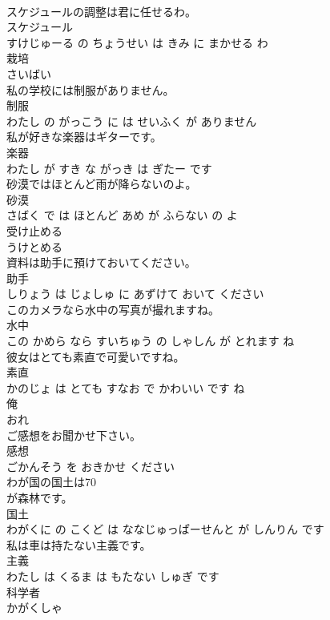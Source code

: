 \documentclass[8pt]{extreport}
\begin{document}
\begin{CJK}{UTF8}{min}
\\	スケジュールの調整は君に任せるわ。	
\\	スケジュール 
\\	すけじゅーる の ちょうせい は きみ に まかせる わ			
\\	栽培	
\\	さいばい			
\\	私の学校には制服がありません。	
\\	制服 
\\	わたし の がっこう に は せいふく が ありません			
\\	私が好きな楽器はギターです。	
\\	楽器 
\\	わたし が すき な がっき は ぎたー です			
\\	砂漠ではほとんど雨が降らないのよ。	
\\	砂漠 
\\	さばく で は ほとんど あめ が ふらない の よ			
\\	受け止める	
\\	うけとめる			
\\	資料は助手に預けておいてください。	
\\	助手 
\\	しりょう は じょしゅ に あずけて おいて ください			
\\	このカメラなら水中の写真が撮れますね。	
\\	水中 
\\	この かめら なら すいちゅう の しゃしん が とれます ね			
\\	彼女はとても素直で可愛いですね。	
\\	素直 
\\	かのじょ は とても すなお で かわいい です ね			
\\	俺	
\\	おれ			
\\	ご感想をお聞かせ下さい。	
\\	感想 
\\	ごかんそう を おきかせ ください			
\\	わが国の国土は70
\\	が森林です。	
\\	国土 
\\	わがくに の こくど は ななじゅっぱーせんと が しんりん です			
\\	私は車は持たない主義です。	
\\	主義 
\\	わたし は くるま は もたない しゅぎ です			
\\	科学者	
\\	かがくしゃ			

\end{CJK}
\end{document}
